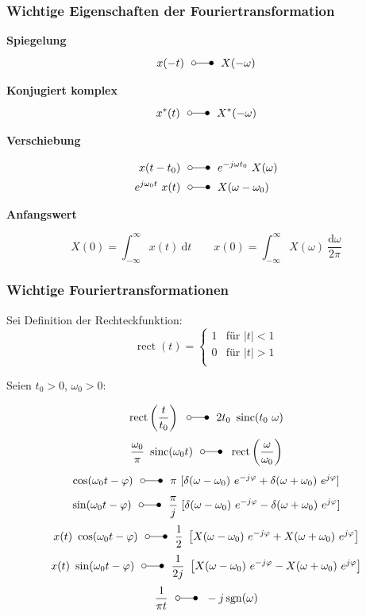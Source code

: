 \documentclass[a4paper, 11pt]{article}
\newcommand{\fancyformula}[2]{
        \small
        \raggedright{\sffamily\textbf{#1}}
        #2
}
\newcommand{\ftransform}{~~\laplace~~}
\DeclareMathOperator{\sinc}{sinc}
\DeclareMathOperator{\sgn}{sgn}
\DeclareMathOperator{\rect}{rect}
\begin{document}
\subsubsection*{Wichtige Eigenschaften der Fouriertransformation}
\begin{multicols}{2}
	\fancyformula{Spiegelung}{\[ x(-t) \ftransform X(-\omega) \]}
	\fancyformula{Konjugiert komplex}{\[ x^*(t) \ftransform X^*(-\omega)\]}
	\fancyformula{Verschiebung}{
		\begin{align*}
			x(t - t_0) & \ftransform e^{-j \omega t_0} ~ X(\omega) \\
			e^{j \omega_0 t} ~ x(t) & \ftransform X(\omega - \omega_0)
		\end{align*}
	}	
	\fancyformula{Anfangswert}{
		\[ X(0) = \int_{-\infty}^{\infty} x(t) ~ \mathrm dt \qquad x(0) = \int_{-\infty}^{\infty} X(\omega) ~ \frac{\mathrm d\omega}{2 \pi} \]	
	}
\end{multicols}


\subsubsection*{Wichtige Fouriertransformationen}
Sei Definition der Rechteckfunktion:
\[
	\rect(t) = \begin{cases}
		1 & \text{für } |t| < 1\\
		0 & \text{für } |t| > 1\\
	\end{cases}
\]

Seien $t_0 > 0$, $\omega_0 > 0$:
\begin{multicols}{2}
	\[ \rect \left(\frac{t}{t_0} \right) \ftransform 2 t_0 ~ \sinc(t_0 ~ \omega) \]
	\[ \frac{\omega_0}{\pi} ~ \sinc(\omega_0 t) \ftransform \rect \left( \frac{\omega}{\omega_0} \right) \]
	\[ \cos(\omega_0 t - \varphi) \ftransform \pi ~ [\delta(\omega - \omega_0) ~ e^{-j \varphi} + \delta(\omega + \omega_0) ~ e^{j \varphi}] \]
	\[ \sin(\omega_0 t - \varphi) \ftransform \frac{\pi}{j} ~ [\delta(\omega - \omega_0) ~ e^{-j \varphi} - \delta(\omega + \omega_0) ~ e^{j \varphi}] \]
	\[ x(t) ~ \cos(\omega_0 t - \varphi) \ftransform \frac{1}{2} ~ \left[X(\omega - \omega_0) ~ e^{-j \varphi} + X(\omega + \omega_0) ~ e^{j \varphi} \right]\]
	\[ x(t) ~ \sin(\omega_0 t - \varphi) \ftransform \frac{1}{2j} ~ \left[X(\omega - \omega_0) ~ e^{-j \varphi} - X(\omega + \omega_0) ~ e^{j \varphi} \right]\]
	\[ \frac{1}{\pi t} \ftransform - j \sgn(\omega)\]
\end{multicols}
\end{document}
